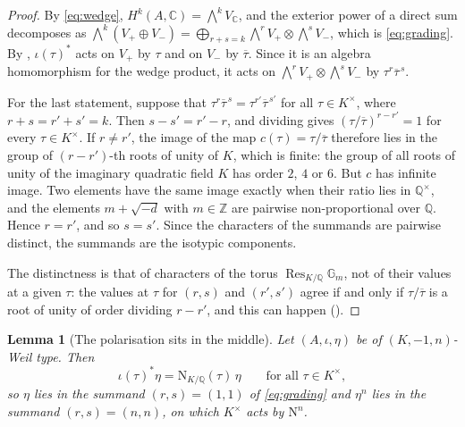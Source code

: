 \documentclass[11pt,reqno]{amsart}
\theoremstyle{plain}
\newtheorem{lemma}[theorem]{Lemma}
\theoremstyle{definition}
\theoremstyle{remark}
\newcommand{\QQ}{\mathbb{Q}}
\newcommand{\ZZ}{\mathbb{Z}}
\newcommand{\CC}{\mathbb{C}}
\newcommand{\Nm}{\mathrm{N}}             %
\DeclareMathOperator{\Res}{Res}
\newcommand{\Kx}{K^{\times}}
\newcommand{\bbar}[1]{\overline{#1}}
\begin{document}
\begin{proof}
By \eqref{eq:wedge}, $H^{k}(A,\CC)=\bigwedge^{k}V_{\CC}$, and the exterior
power of a direct sum decomposes as
$\bigwedge^{k}(V_{+}\oplus V_{-})=\bigoplus_{r+s=k}\bigwedge^{r}V_{+}\otimes\bigwedge^{s}V_{-}$,
which is \eqref{eq:grading}. By , $\iota(\tau)^{*}$ acts on
$V_{+}$ by $\tau$ and on $V_{-}$ by $\bbar{\tau}$. Since it is an algebra
homomorphism for the wedge product, it acts on
$\bigwedge^{r}V_{+}\otimes\bigwedge^{s}V_{-}$ by $\tau^{r}\bbar{\tau}^{\,s}$.

For the last statement, suppose that
$\tau^{r}\bbar{\tau}^{\,s}=\tau^{r'}\bbar{\tau}^{\,s'}$ for all $\tau\in\Kx$,
where $r+s=r'+s'=k$. Then $s-s'=r'-r$, and dividing gives
$(\tau/\bbar{\tau})^{r-r'}=1$ for every $\tau\in\Kx$. If $r\ne r'$, the image
of the map $c(\tau)=\tau/\bbar{\tau}$ therefore lies in the group of
$(r-r')$-th roots of unity of $K$, which is finite: the group of all roots of
unity of the imaginary quadratic field $K$ has order $2$, $4$ or $6$. But $c$
has infinite image. Two elements have the same image exactly when their ratio
lies in $\QQ^{\times}$, and the elements $m+\sqrt{-d}$ with $m\in\ZZ$ are
pairwise non-proportional over $\QQ$. Hence $r=r'$, and so $s=s'$. Since the
characters of the summands are pairwise distinct, the summands are the
isotypic components.

The distinctness is that of characters of the torus
$\Res_{K/\QQ}\mathbb{G}_{m}$, not of their values at a given $\tau$: the
values at $\tau$ for $(r,s)$ and $(r',s')$ agree if and only if
$\tau/\bbar{\tau}$ is a root of unity of order dividing $r-r'$, and this can
happen ().
\end{proof}

\begin{lemma}[The polarisation sits in the middle]\label{lem:NSchar}
Let $(A,\iota,\eta)$ be of $(K,-1,n)$-Weil type. Then
\[
  \iota(\tau)^{*}\eta=\Nm_{K/\QQ}(\tau)\,\eta\qquad\text{for all }\tau\in\Kx,
\]
so $\eta$ lies in the summand $(r,s)=(1,1)$ of \eqref{eq:grading} and
$\eta^{n}$ lies in the summand $(r,s)=(n,n)$, on which $\Kx$ acts by $\Nm^{n}$.
\end{lemma}
\end{document}
